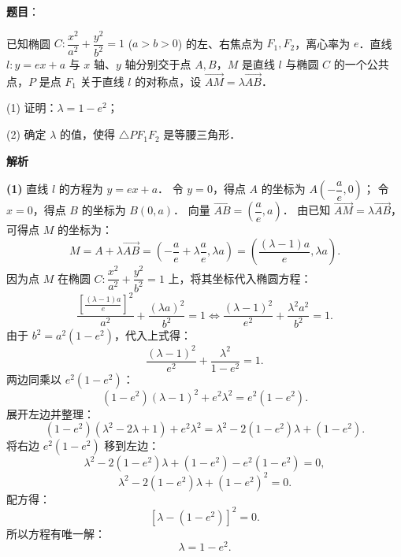 \begin{answer}

\textbf{题目}：

已知椭圆 $C: \dfrac{x^2}{a^2} + \dfrac{y^2}{b^2} = 1$ ($a > b > 0$) 的左、右焦点为 $F_1, F_2$，离心率为 $e$．直线 $l: y = ex + a$ 与 $x$ 轴、$y$ 轴分别交于点 $A, B$，$M$ 是直线 $l$ 与椭圆 $C$ 的一个公共点，$P$ 是点 $F_1$ 关于直线 $l$ 的对称点，设 $\vec{AM} = \lambda\vec{AB}$．

(1) 证明：$\lambda = 1 - e^2$；

(2) 确定 $\lambda$ 的值，使得 $\triangle PF_1F_2$ 是等腰三角形．

\textbf{解析}

\textbf{(1)}
直线 $l$ 的方程为 $y = ex + a$．
令 $y = 0$，得点 $A$ 的坐标为 $A\left(-\dfrac{a}{e}, 0\right)$；
令 $x = 0$，得点 $B$ 的坐标为 $B(0, a)$．
向量 $\vec{AB} = \left(\dfrac{a}{e}, a\right)$．
由已知 $\vec{AM} = \lambda \vec{AB}$，可得点 $M$ 的坐标为：
\nopagebreak[4]
\[
M = A + \lambda \vec{AB} = \left(-\frac{a}{e} + \lambda \frac{a}{e}, \lambda a\right) = \left(\frac{(\lambda - 1)a}{e}, \lambda a\right).
\]
因为点 $M$ 在椭圆 $C: \dfrac{x^2}{a^2} + \dfrac{y^2}{b^2} = 1$ 上，将其坐标代入椭圆方程：
\nopagebreak[4]
\[
\frac{\left[\frac{(\lambda - 1)a}{e}\right]^2}{a^2} + \frac{(\lambda a)^2}{b^2} = 1 \iff \frac{(\lambda - 1)^2}{e^2} + \frac{\lambda^2 a^2}{b^2} = 1.
\]
由于 $b^2 = a^2(1 - e^2)$，代入上式得：
\nopagebreak[4]
\[
\frac{(\lambda - 1)^2}{e^2} + \frac{\lambda^2}{1 - e^2} = 1.
\]
两边同乘以 $e^2(1 - e^2)$：
\nopagebreak[4]
\[
(1 - e^2)(\lambda - 1)^2 + e^2\lambda^2 = e^2(1 - e^2).
\]
展开左边并整理：
\nopagebreak[4]
\[
(1 - e^2)(\lambda^2 - 2\lambda + 1) + e^2\lambda^2 = \lambda^2 - 2(1 - e^2)\lambda + (1 - e^2).
\]
将右边 $e^2(1 - e^2)$ 移到左边：
\nopagebreak[4]
\[
\lambda^2 - 2(1 - e^2)\lambda + (1 - e^2) - e^2(1 - e^2) = 0,
\]
\nopagebreak[4]
\[
\lambda^2 - 2(1 - e^2)\lambda + (1 - e^2)^2 = 0.
\]
配方得：
\nopagebreak[4]
\[
[\lambda - (1 - e^2)]^2 = 0.
\]
所以方程有唯一解：
\nopagebreak[4]
\[
\lambda = 1 - e^2.
\]


\end{answer}

